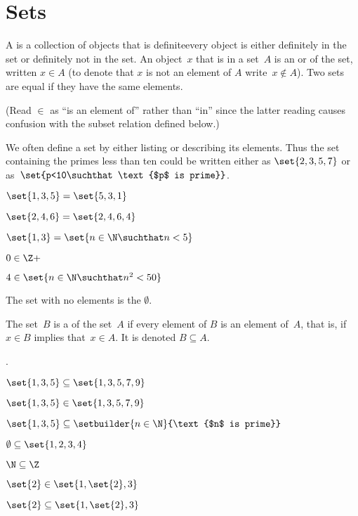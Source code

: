 \documentclass{ibl}
\begin{document}
\chapter{Sets}
\begin{df}
A  is a collection of objects that is definite\Dash every 
object is either
definitely in the set or definitely not in the set.
An object~$x$ that is in a set~$A$ is an 
or 
of the set, written $x\in A$
(to denote that $x$ is not an element of $A$ write~$x\notin A$).
Two sets are equal if they have the same elements.
\end{df}
\noindent (Read $\in$ as ``is an element of'' rather than ``in'' since the 
latter reading causes confusion with 
the subset relation defined below.)

We often define a set by either listing or describing its elements.
Thus the set containing the primes less than ten could be written
either as $\set{2, 3, 5, 7}$ or as~$\set{p<10\suchthat \text{$p$ is prime}}$.

\begin{ex} \pord
\begin{exes}
\item $\set{1,3,5}=\set{5,3,1}$    
\item $\set{2, 4, 6}=\set{2, 4, 6, 4}$    
\item $\set{1, 3}=\set{n\in\N\suchthat n<5}$ 
\item $0\in\Z+$   
\item $4\in\set{n\in\N\suchthat n^2<50}$
\end{exes}
\end{ex}

\begin{df}
The set with no elements is the  $\emptyset$.  
\end{df}

\begin{df}
The set~$B$ is a  of the set~$A$
if every element of $B$ is an element of~$A$,
that is, if $x\in B$ implies that~$x\in A$.
It is denoted $B\subseteq A$.
\end{df}

\begin{ex} \pord.
\begin{exes}
\item $\set{1,3,5}\subseteq\set{1,3, 5, 7, 9}$
\item $\set{1, 3, 5}\in\set{1, 3, 5, 7, 9}$   
\item $\set{1,3,5}\subseteq\setbuilder{n\in\N}{\text{$n$ is prime}}$
\item $\emptyset\subseteq\set{1, 2, 3, 4}$
\item $\N\subseteq\Z$
\item $\set{2}\in\set{1, \set{2}, 3}$
\item $\set{2}\subseteq\set{1, \set{2}, 3}$
\end{exes}
\end{ex}
\end{document}
